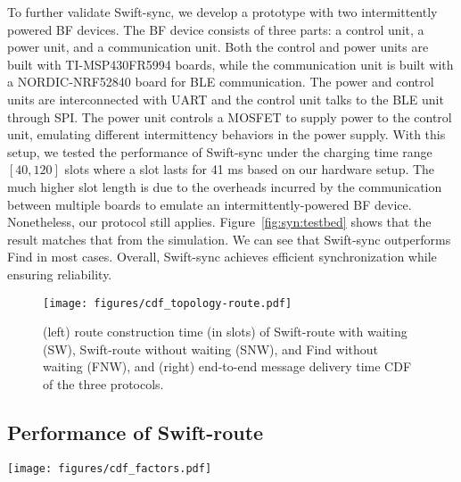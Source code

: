 \documentclass[lettersize,journal]{IEEEtran}
\newcommand{\ours}{Swift\xspace}
\newcommand{\sync}{Swift-sync\xspace}
\newcommand{\route}{Swift-route\xspace}
\newcommand{\forward}{Swift-forward\xspace}
\begin{document}
To further validate \ours-sync, we develop a prototype with two intermittently powered BF devices. The BF device consists of three parts: a control unit, a power unit, and a communication unit. Both the control and power units are built with TI-MSP430FR5994 boards, while the communication unit is built with a NORDIC-NRF52840 board for BLE communication. The power and control units are interconnected with UART and the control unit talks to the BLE unit through SPI. The power unit controls a MOSFET to supply power to the control unit, emulating different intermittency behaviors in the power supply. With this setup, we tested the performance of \ours-sync under the charging time range $[40,120]$ slots where a slot lasts for 41 ms based on our hardware setup. The much higher slot length is due to the overheads incurred by the communication between multiple boards to emulate an intermittently-powered BF device. 
Nonetheless, our protocol still applies.  Figure~\ref{fig:syn:testbed} shows that the result matches that from the simulation. We can see that \ours-sync outperforms Find in most cases. Overall, \sync achieves efficient synchronization while ensuring reliability.

\begin{figure}[!t]
    \centering
    \texttt{[image: figures/cdf\_topology-route.pdf]}
    \caption{(left) route construction time (in slots) of \route with waiting (SW), \route without waiting (SNW), and Find without waiting (FNW), and (right) end-to-end message delivery time CDF of the three protocols.}
    \label{fig:eval:route}
\end{figure}

\subsection{Performance of \route}
\begin{figure*}[!t]
    \centering
    \hfill
    \caption{Message forwarding time (in slots) comparison between \forward and a baseline without fast synchronization under varying energy conditions and two field scenarios.}
    \label{fig:eval:forward:overall}
\end{figure*}

\begin{figure*}[!t]
    \centering
\texttt{[image: figures/cdf\_factors.pdf]}
    \caption{Performance of \ours under varying parameter setups: (left figure) the communication range, (middle figure) the maximum charging time difference, and (right figure) the message intensity.}
    \label{fig:eval:forward:impact}
\end{figure*}
\end{document}
